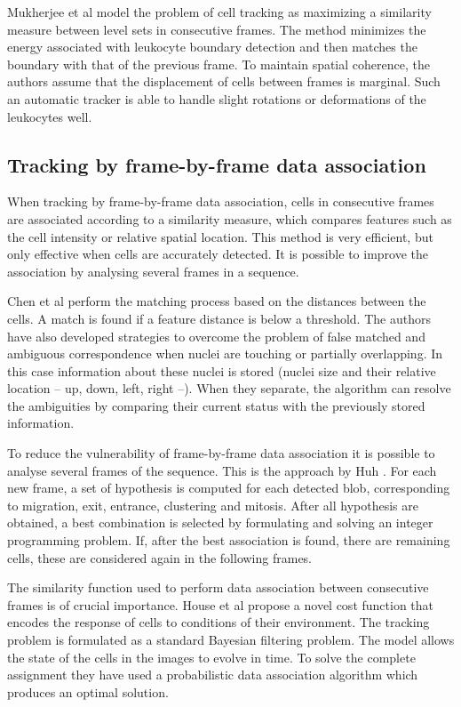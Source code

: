 Mukherjee et al \cite{mukherjee04} model the problem of cell tracking as maximizing a similarity measure between level sets in consecutive frames. The method minimizes the energy associated with leukocyte boundary detection and then matches the boundary with that of the previous frame. To maintain spatial coherence, the authors assume that the displacement of cells between frames is marginal. Such an automatic tracker is able to handle slight rotations or deformations of the leukocytes well.

\subsection{Tracking by frame-by-frame data association \statusfirstdraft}

When tracking by frame-by-frame data association, cells in consecutive frames are associated according to a similarity measure, which compares features such as the cell intensity or relative spatial location. This method is very efficient, but only effective when cells are accurately detected. It is possible to improve the association by analysing several frames in a sequence.

Chen et al \cite{chen06} perform the matching process based on the distances between the cells. A match is found if a feature distance is below a threshold. The authors have also developed strategies to overcome the problem of false matched and ambiguous correspondence when nuclei are touching or partially overlapping. In this case information about these nuclei is stored (nuclei size and their relative location -- up, down, left, right --). When they separate, the algorithm can resolve the ambiguities by comparing their current status with the previously stored information.

To reduce the vulnerability of frame-by-frame data association it is possible to analyse several frames of the sequence. This is the approach by Huh \cite{huh13}. For each new frame, a set of hypothesis is computed for each detected blob, corresponding to migration, exit, entrance, clustering and mitosis. After all hypothesis are obtained, a best combination is selected by formulating and solving an integer programming problem. If, after the best association is found, there are remaining cells, these are considered again in the following frames.

The similarity function used to perform data association between consecutive frames is of crucial importance. House et al \cite{house09} propose a novel cost function that encodes the response of cells to conditions of their environment. The tracking problem is formulated as a standard Bayesian filtering problem. The model allows the state of the cells in the images to evolve in time. To solve the complete assignment they have used a probabilistic data association algorithm which produces an optimal solution.

